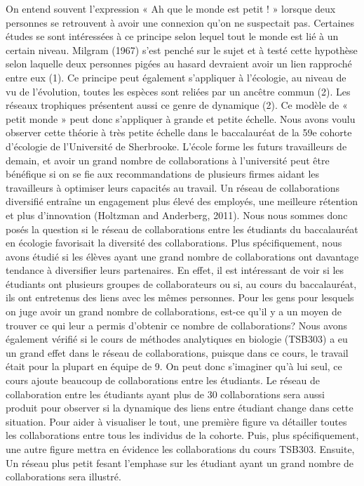 \documentclass[9pt,twocolumn,twoside,]{pnas-new}
\begin{document}
On entend souvent l'expression « Ah que le monde est petit ! » lorsque
deux personnes se retrouvent à avoir une connexion qu'on ne suspectait
pas. Certaines études se sont intéressées à ce principe selon lequel
tout le monde est lié à un certain niveau. Milgram (1967) s'est penché
sur le sujet et à testé cette hypothèse selon laquelle deux personnes
pigées au hasard devraient avoir un lien rapproché entre eux (1). Ce
principe peut également s'appliquer à l'écologie, au niveau de vu de
l'évolution, toutes les espèces sont reliées par un ancêtre commun (2).
Les réseaux trophiques présentent aussi ce genre de dynamique (2). Ce
modèle de « petit monde » peut donc s'appliquer à grande et petite
échelle. Nous avons voulu observer cette théorie à très petite échelle
dans le baccalauréat de la 59e cohorte d'écologie de l'Université de
Sherbrooke. L'école forme les futurs travailleurs de demain, et avoir un
grand nombre de collaborations à l'université peut être bénéfique si on
se fie aux recommandations de plusieurs firmes aidant les travailleurs à
optimiser leurs capacités au travail. Un réseau de collaborations
diversifié entraîne un engagement plus élevé des employés, une meilleure
rétention et plus d'innovation (Holtzman and Anderberg, 2011). Nous nous
sommes donc posés la question si le réseau de collaborations entre les
étudiants du baccalauréat en écologie favorisait la diversité des
collaborations. Plus spécifiquement, nous avons étudié si les élèves
ayant une grand nombre de collaborations ont davantage tendance à
diversifier leurs partenaires. En effet, il est intéressant de voir si
les étudiants ont plusieurs groupes de collaborateurs ou si, au cours du
baccalauréat, ils ont entretenus des liens avec les mêmes personnes.
Pour les gens pour lesquels on juge avoir un grand nombre de
collaborations, est-ce qu'il y a un moyen de trouver ce qui leur a
permis d'obtenir ce nombre de collaborations? Nous avons également
vérifié si le cours de méthodes analytiques en biologie (TSB303) a eu un
grand effet dans le réseau de collaborations, puisque dans ce cours, le
travail était pour la plupart en équipe de 9. On peut donc s'imaginer
qu'à lui seul, ce cours ajoute beaucoup de collaborations entre les
étudiants. Le réseau de collaboration entre les étudiants ayant plus de
30 collaborations sera aussi produit pour observer si la dynamique des
liens entre étudiant change dans cette situation. Pour aider à
visualiser le tout, une première figure va détailler toutes les
collaborations entre tous les individus de la cohorte. Puis, plus
spécifiquement, une autre figure mettra en évidence les collaborations
du cours TSB303. Ensuite, Un réseau plus petit fesant l'emphase sur les
étudiant ayant un grand nombre de collaborations sera illustré.
\end{document}
